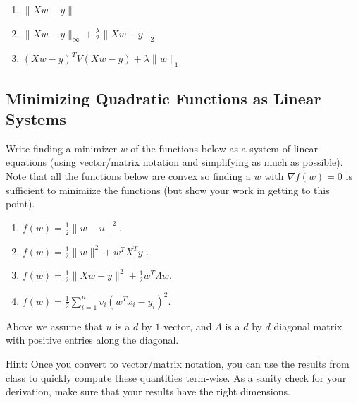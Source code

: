 \documentclass{article}
\def\blu#1{{\color{blu}#1}}
\def\norm#1{\|#1\|}
\def\enum#1{\begin{enumerate}#1\end{enumerate}}
\begin{document}
\begin{enumerate}
     \item  $ \norm{Xw-y}$
    \item  $ \norm{Xw-y}_\infty +   \frac{\lambda}{2}\norm{Xw-y}_2$
    \item  $ (Xw-y)^T V(Xw-y) +   \lambda\norm{w}_1$
 
\end{enumerate}


\subsection{Minimizing Quadratic Functions as Linear Systems}

Write finding a minimizer $w$ of the functions below as a system of linear equations (using vector/matrix notation and simplifying as much as possible). Note that all the functions below are convex  so finding a $w$ with $\nabla f(w) = 0$ is sufficient to minimiize the functions (but show your work in getting to this point).
\blu{\enum{
\item $f(w) = \frac{1}{2}\norm{w-u}^2$.
\item $f(w) = \frac{1}{2}\norm{w}^2 + w^TX^Ty$ .
\item $f(w)= \frac{1}{2}\norm{Xw - y}^2 + \frac{1}{2}w^T\Lambda w$.
\item $f(w) = \frac{1}{2}\sum_{i=1}^n v_i (w^Tx_i - y_i)^2$.
}}
Above we assume that $u$ is a $d$ by $1$ vector, and $\Lambda$ is a $d$ by $d$ diagonal matrix with positive entries along the diagonal.

Hint: Once you convert to vector/matrix notation, you can use the results from class to quickly compute these quantities term-wise. As a sanity check for your derivation, make sure that your results have the right dimensions.
\end{document}
